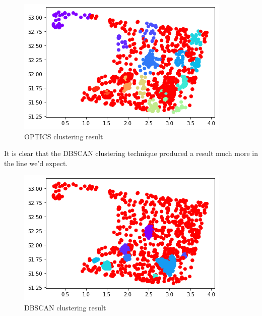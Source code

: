 \begin{figure}[ht]
\begin{center}
\centerline{\includegraphics[width=\columnwidth]{images/cluster_optics.png}}
\caption{OPTICS clustering result}
\label{OPTICS Clustering}
\end{center}
\end{figure}

It is clear that the DBSCAN clustering technique produced a result much more in the line we'd expect. 

\begin{figure}[ht]
\begin{center}
\centerline{\includegraphics[width=\columnwidth]{images/cluster_dbscan.png}}
\caption{DBSCAN clustering result}
\label{DBSCAN Clustering}
\end{center}
\end{figure}

